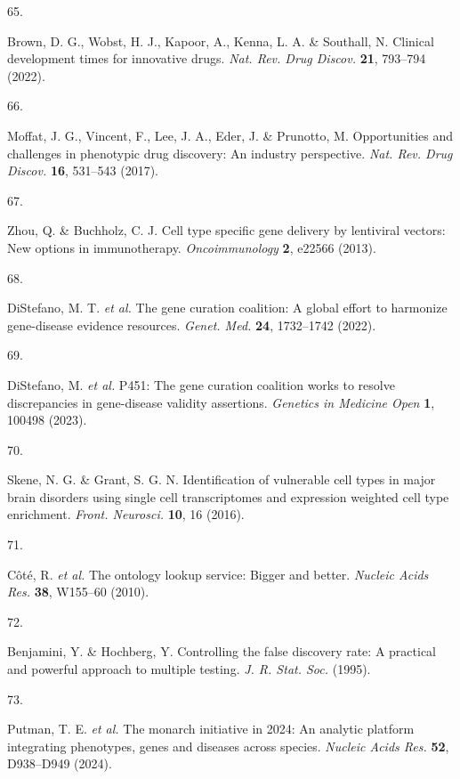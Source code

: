 \documentclass[
sn-nature
]{sn-jnl}
\newlength{\cslhangindent}
\newlength{\csllabelwidth}
\newenvironment{CSLReferences}[2] %
 {\begin{list}{}{%
  \setlength{\itemindent}{0pt}
  \setlength{\leftmargin}{0pt}
  \setlength{\parsep}{0pt}
  \ifodd #1
   \setlength{\leftmargin}{\cslhangindent}
   \setlength{\itemindent}{-1\cslhangindent}
  \fi
  \setlength{\itemsep}{#2\baselineskip}}}
 {\end{list}}
\newcommand{\CSLLeftMargin}[1]{\parbox[t]{\csllabelwidth}{\strut#1\strut}}
\newcommand{\CSLRightInline}[1]{\parbox[t]{\linewidth - \csllabelwidth}{\strut#1\strut}}
\begin{document}
\begin{CSLReferences}{0}{0}
\CSLLeftMargin{65. }%
\CSLRightInline{Brown, D. G., Wobst, H. J., Kapoor, A., Kenna, L. A. \&
Southall, N. Clinical development times for innovative drugs. \emph{Nat.
Rev. Drug Discov.} \textbf{21}, 793--794 (2022).}

\CSLLeftMargin{66. }%
\CSLRightInline{Moffat, J. G., Vincent, F., Lee, J. A., Eder, J. \&
Prunotto, M. Opportunities and challenges in phenotypic drug discovery:
An industry perspective. \emph{Nat. Rev. Drug Discov.} \textbf{16},
531--543 (2017).}

\CSLLeftMargin{67. }%
\CSLRightInline{Zhou, Q. \& Buchholz, C. J. Cell type specific gene
delivery by lentiviral vectors: New options in immunotherapy.
\emph{Oncoimmunology} \textbf{2}, e22566 (2013).}

\CSLLeftMargin{68. }%
\CSLRightInline{DiStefano, M. T. \emph{et al.} The gene curation
coalition: A global effort to harmonize gene-disease evidence resources.
\emph{Genet. Med.} \textbf{24}, 1732--1742 (2022).}

\CSLLeftMargin{69. }%
\CSLRightInline{DiStefano, M. \emph{et al.} P451: The gene curation
coalition works to resolve discrepancies in gene-disease validity
assertions. \emph{Genetics in Medicine Open} \textbf{1}, 100498 (2023).}

\CSLLeftMargin{70. }%
\CSLRightInline{Skene, N. G. \& Grant, S. G. N. Identification of
vulnerable cell types in major brain disorders using single cell
transcriptomes and expression weighted cell type enrichment.
\emph{Front. Neurosci.} \textbf{10}, 16 (2016).}

\CSLLeftMargin{71. }%
\CSLRightInline{Côté, R. \emph{et al.} The ontology lookup service:
Bigger and better. \emph{Nucleic Acids Res.} \textbf{38}, W155--60
(2010).}

\CSLLeftMargin{72. }%
\CSLRightInline{Benjamini, Y. \& Hochberg, Y. Controlling the false
discovery rate: A practical and powerful approach to multiple testing.
\emph{J. R. Stat. Soc.} (1995).}

\CSLLeftMargin{73. }%
\CSLRightInline{Putman, T. E. \emph{et al.} The monarch initiative in
2024: An analytic platform integrating phenotypes, genes and diseases
across species. \emph{Nucleic Acids Res.} \textbf{52}, D938--D949
(2024).}


\end{CSLReferences}
\end{document}
